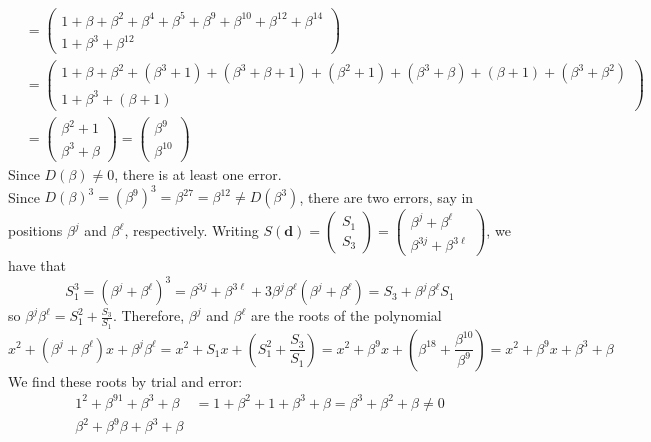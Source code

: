 \documentclass[11pt]{article}
\renewcommand{\vec}[1]{\mathbf{#1}}
\newcommand{\vc}[1]{\begin{pmatrix}#1\end{pmatrix}}
\begin{document}
\begin{itemize}
\begin{align*}
                               &= \vc{1 + \beta   + \beta^2 + \beta^4    + \beta^5    + \beta^9    + \beta^{10} + \beta^{12} + \beta^{14} \\
                                      1 + \beta^3 + \beta^{12}}\\
                               &= \vc{1 + \beta   + \beta^2 + (\beta^3+1)+ (\beta^3+\beta+1) + (\beta^2+1) + (\beta^3 + \beta) + (\beta + 1) + (\beta^3 + \beta^2)\\
                                      1 + \beta^3 + (\beta+1)}\\
                               &= \vc{\beta^2+1\\
                                      \beta^3+\beta}
                                = \vc{\beta^9\\
                                      \beta^{10}}
                   \end{align*}
                   Since $D(\beta)\neq 0$, there is at least one error.\\
                   Since $D(\beta)^3 = (\beta^9)^3 = \beta^{27} = \beta^{12} \neq D(\beta^3)$,
                   there are two errors, say in positions $\beta^j$ and $\beta^\ell$, respectively.
                   Writing $S(\vec{d}) = \vc{S_1\\S_3} = \vc{\beta^j + \beta^\ell\\\beta^{3j} + \beta^{3\ell}}$,
                   we have that 
                   \[
                     S_1^3 = (\beta^j + \beta^\ell)^3 
                           = \beta^{3j} + \beta^{3\ell} + 3\beta^j\beta^\ell(\beta^j + \beta^\ell)
                           = S_3 + \beta^j\beta^\ell S_1
                   \]
                   so $\beta^j\beta^\ell = S_1^2 + \frac{S_3}{S_1}$.
                   Therefore,
                   $\beta^j$ and $\beta^\ell$ are the roots of the polynomial
                   \[
                     x^2 + (\beta^j+\beta^\ell)x + \beta^j\beta^\ell
                   = x^2 + S_1x + (S_1^2 + \frac{S_3}{S_1})
                   = x^2 + \beta^9x + (\beta^{18}+\frac{\beta^{10}}{\beta^9})
                   = x^2 + \beta^9x + \beta^3 + \beta
                   \]
                   We find these roots by trial and error:
                   \begin{align*}
                        1^2 + \beta^91 + \beta^3 + \beta
                     &= 1 + \beta^2 + 1 + \beta^3 + \beta
                      = \beta^3 + \beta^2 + \beta
                      \neq 0\\
                        \beta^2 + \beta^9\beta + \beta^3 + \beta

\end{align*}
\end{itemize}
\end{document}
